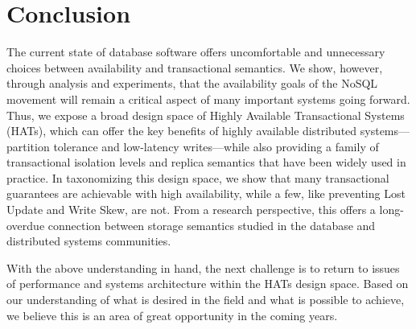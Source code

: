 
\section{Conclusion}
The current state of database software offers uncomfortable and
unnecessary choices between availability and transactional semantics.
We show, however, through analysis and experiments, that the
availability goals of the NoSQL movement will remain a critical aspect
of many important systems going forward. Thus, we expose a broad
design space of Highly Available Transactional Systems (HATs), which
can offer the key benefits of highly available distributed
systems---partition tolerance and low-latency writes---while also
providing a family of transactional isolation levels and replica
semantics that have been widely used in practice.  In taxonomizing
this design space, we show that many transactional guarantees are
achievable with high availability, while a few, like preventing Lost
Update and Write Skew, are not. From a research perspective, this
offers a long-overdue connection between storage semantics studied in
the database and distributed systems communities.

With the above understanding in hand, the next challenge is to return to
issues of performance and systems architecture within the HATs design
space.  Based on our understanding of what is desired in the field and
what is possible to achieve, we believe this is an area of great
opportunity in the coming years.



